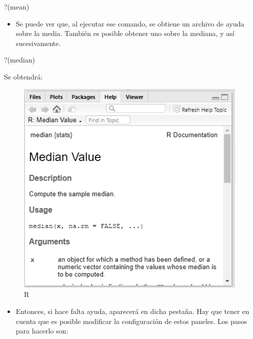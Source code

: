 \documentclass[
]{article}
\newenvironment{Shaded}{\begin{snugshade}}{\end{snugshade}}
\newcommand{\AttributeTok}[1]{\textcolor[rgb]{0.13,0.29,0.53}{#1}}
\newcommand{\NormalTok}[1]{#1}
\newcommand{\StringTok}[1]{\textcolor[rgb]{0.31,0.60,0.02}{#1}}
\providecommand{\tightlist}{%
  \setlength{\itemsep}{0pt}\setlength{\parskip}{0pt}}
\begin{document}
\begin{Shaded}
\begin{Highlighting}[]
\StringTok{\textasciigrave{}}\AttributeTok{?}\StringTok{\textasciigrave{}}\NormalTok{(mean)}
\end{Highlighting}
\end{Shaded}

\begin{itemize}
\tightlist
\item
  Se puede ver que, al ejecutar ese comando, se obtiene un archivo de ayuda sobre la media. También es posible obtener uno sobre la mediana, y así sucesivamente.
\end{itemize}

\begin{Shaded}
\begin{Highlighting}[]
\StringTok{\textasciigrave{}}\AttributeTok{?}\StringTok{\textasciigrave{}}\NormalTok{(median)}
\end{Highlighting}
\end{Shaded}

Se obtendrá:

\begin{figure}

{\centering \includegraphics[width=0.6\linewidth]{imagenes_byn/ayuda} 

}

\caption{R}\label{fig:unnamed-chunk-150}
\end{figure}

\begin{itemize}
\tightlist
\item
  Entonces, si hace falta ayuda, aparecerá en dicha pestaña. Hay que tener en cuenta que es posible modificar la configuración de estos paneles. Los pasos para hacerlo son:
\end{itemize}
\end{document}

